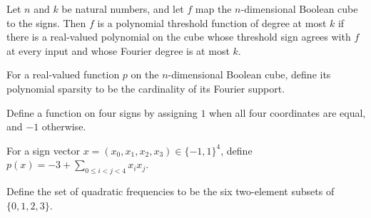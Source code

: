\begin{definition}
\label{FABL.IsPolynomialThreshold}
\leanok
{}
Let $n$ and $k$ be natural numbers, and let $f$ map the $n$-dimensional Boolean cube to
the signs. Then $f$ is a polynomial threshold function of degree at most $k$ if there is
a real-valued polynomial on the cube whose threshold sign agrees with $f$ at every input
and whose Fourier degree is at most $k$.
\end{definition}

\begin{definition}
\label{FABL.polynomialSparsity}
\leanok
{}
For a real-valued function $p$ on the $n$-dimensional Boolean cube, define its
polynomial sparsity to be the cardinality of its Fourier support.
\end{definition}

\begin{definition}
\label{FABL.fourBitEquality}
\leanok
{}
Define a function on four signs by assigning $1$ when all four coordinates are equal,
and $-1$ otherwise.
\end{definition}

\begin{definition}
\label{FABL.fourBitEqualityPolynomial}
\leanok
{}
For a sign vector $x=(x_0,x_1,x_2,x_3)\in\{-1,1\}^4$, define $p(x)=-3+\sum_{0\le
i<j<4}x_i x_j$.
\end{definition}

\begin{definition}
\label{FABL.fourBitEqualityQuadraticFrequencies}
\leanok
Define the set of quadratic frequencies to be the six two-element subsets of
$\{0,1,2,3\}$.
\end{definition}

